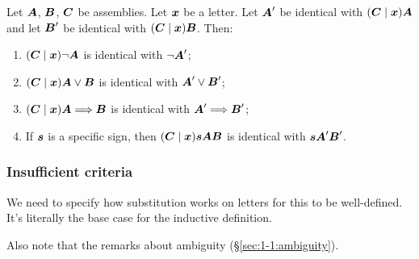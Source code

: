 \begin{cs}\label{cs5}
Let $\boldsymbol{A}$, $\boldsymbol{B}$, $\boldsymbol{C}$
be assemblies. Let $\boldsymbol{x}$ be a letter.
Let $\boldsymbol{A}'$ be identical with
$(\boldsymbol{C}\mid\boldsymbol{x})\boldsymbol{A}$ and let
$\boldsymbol{B}'$ be identical with $(\boldsymbol{C}\mid\boldsymbol{x})\boldsymbol{B}$.
Then:
\begin{enumerate}
\item $(\boldsymbol{C}\mid\boldsymbol{x})\neg\boldsymbol{A}$ is
  identical with $\neg\boldsymbol{A}'$;
\item $(\boldsymbol{C}\mid\boldsymbol{x})\boldsymbol{A}\lor\boldsymbol{B}$
  is identical with $\boldsymbol{A}'\lor\boldsymbol{B}'$;
\item $(\boldsymbol{C}\mid\boldsymbol{x})\boldsymbol{A}\Longrightarrow\boldsymbol{B}$
  is identical with $\boldsymbol{A}'\Longrightarrow\boldsymbol{B}'$;
\item If $\boldsymbol{s}$ is a specific sign, then
  $(\boldsymbol{C}\mid\boldsymbol{x})\boldsymbol{s}\boldsymbol{A}\boldsymbol{B}$
  is identical with $\boldsymbol{s}\boldsymbol{A}'\boldsymbol{B}'$.
\end{enumerate}
\end{cs}

\subsubsection{Insufficient criteria}
We need to specify how substitution works on letters for this to be
well-defined. It's literally the base case for the inductive definition.

Also note that the remarks about ambiguity (\S\ref{sec:1-1:ambiguity}).
